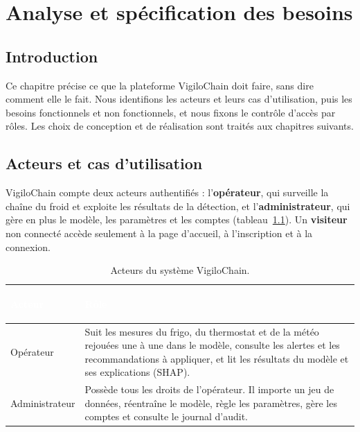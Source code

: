 \chapter{Analyse et spécification des besoins}\label{chap2}
\pagestyle{fancy}

\section*{Introduction}

Ce chapitre précise ce que la plateforme VigiloChain doit faire, sans dire
comment elle le fait. Nous identifions les acteurs et leurs cas d'utilisation,
puis les besoins fonctionnels et non fonctionnels, et nous fixons le contrôle
d'accès par rôles. Les choix de conception et de réalisation sont traités aux
chapitres suivants.

\section{Acteurs et cas d'utilisation}

VigiloChain compte deux acteurs authentifiés : l'\textbf{opérateur}, qui
surveille la chaîne du froid et exploite les résultats de la détection, et
l'\textbf{administrateur}, qui gère en plus le modèle, les paramètres et les
comptes (tableau~\ref{tab:acteurs}). Un \textbf{visiteur} non connecté accède
seulement à la page d'accueil, à l'inscription et à la connexion.

\begin{table}[H]
\centering
\small
\renewcommand{\arraystretch}{1.4}
\setlength{\arrayrulewidth}{0.8pt}
\caption{Acteurs du système VigiloChain.}
\label{tab:acteurs}
\begin{tabularx}{\textwidth}{@{}>{\bfseries\raggedright\arraybackslash}p{3.0cm} >{\raggedright\arraybackslash}X@{}}
\rowcolor{thead}
\textcolor{white}{\textbf{Acteur}} & \textcolor{white}{\textbf{Rôle}} \\
\hline
Opérateur &
Suit les mesures du frigo, du thermostat et de la météo rejouées une à une
dans le modèle, consulte les alertes et les recommandations à appliquer, et lit
les résultats du modèle et ses explications (SHAP). \\
\rowcolor{trowa}
Administrateur &
Possède tous les droits de l'opérateur. Il importe un jeu de données,
réentraîne le modèle, règle les paramètres, gère les comptes et consulte le
journal d'audit. \\
\hline
\end{tabularx}
\end{table}

